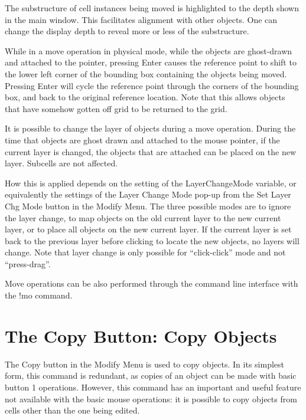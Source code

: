 The substructure of cell instances being moved is highlighted to the
depth shown in the main window.  This facilitates alignment with other
objects.  One can change the display depth to reveal more or less of
the substructure.

While in a move operation in physical mode, while the objects are
ghost-drawn and attached to the pointer, pressing {\kb Enter} causes
the reference point to shift to the lower left corner of the bounding
box containing the objects being moved.  Pressing {\kb Enter} will
cycle the reference point through the corners of the bounding box, and
back to the original reference location.  Note that this allows
objects that have somehow gotten off grid to be returned to the grid.

It is possible to change the layer of objects during a move operation. 
During the time that objects are ghost drawn and attached to the mouse
pointer, if the current layer is changed, the objects that are
attached can be placed on the new layer.  Subcells are not affected. 

How this is applied depends on the setting of the {\et
LayerChangeMode} variable, or equivalently the settings of the {\cb
Layer Change Mode} pop-up from the {\cb Set Layer Chg Mode} button
in the {\cb Modify Menu}.  The three possible modes are to ignore the
layer change, to map objects on the old current layer to the new
current layer, or to place all objects on the new current layer.  If
the current layer is set back to the previous layer before clicking to
locate the new objects, no layers will change.  Note that layer change
is only possible for ``click-click'' mode and not ``press-drag''.

Move operations can be also performed through the command line
interface with the {\cb !mo} command.


\section{The {\cb Copy} Button: Copy Objects}
The {\cb Copy} button in the {\cb Modify Menu} is used to copy
objects.  In its simplest form, this command is redundant, as copies
of an object can be made with basic button 1 operations.  However,
this command has an important and useful feature not available with
the basic mouse operations:  it is possible to copy objects from cells
other than the one being edited.

